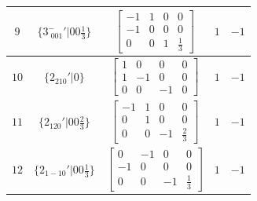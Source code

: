 \documentclass[fleqn,8pt]{jsarticle}
\begin{document}
\begin{longtable}{ccccc}
$ 9 $ & $ \{3^{-}_{\,\,001}{}'|0 0 \frac{1}{3}\} $ & $ \begin{bmatrix} -1 & 1 & 0 & 0 \\ -1 & 0 & 0 & 0 \\ 0 & 0 & 1 & \frac{1}{3} \end{bmatrix} $ & $ 1 $ & $ -1 $ \\ \hline
$ 10 $ & $ \{2{}_{210}{}'|0\} $ & $ \begin{bmatrix} 1 & 0 & 0 & 0 \\ 1 & -1 & 0 & 0 \\ 0 & 0 & -1 & 0 \end{bmatrix} $ & $ 1 $ & $ -1 $ \\ \hline
$ 11 $ & $ \{2{}_{120}{}'|0 0 \frac{2}{3}\} $ & $ \begin{bmatrix} -1 & 1 & 0 & 0 \\ 0 & 1 & 0 & 0 \\ 0 & 0 & -1 & \frac{2}{3} \end{bmatrix} $ & $ 1 $ & $ -1 $ \\ \hline
$ 12 $ & $ \{2{}_{1-10}{}'|0 0 \frac{1}{3}\} $ & $ \begin{bmatrix} 0 & -1 & 0 & 0 \\ -1 & 0 & 0 & 0 \\ 0 & 0 & -1 & \frac{1}{3} \end{bmatrix} $ & $ 1 $ & $ -1 $ \\
\end{longtable}
\end{document}

